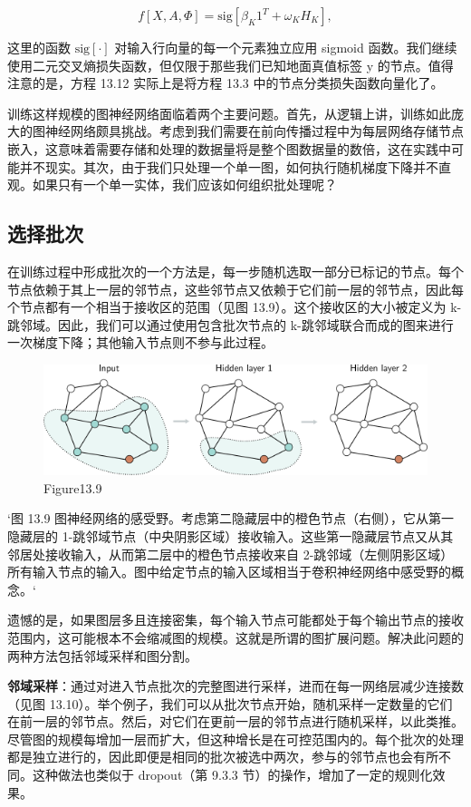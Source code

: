 \begin{equation}
f[X, A, \Phi] = \text{sig} [\beta_K 1^T + \omega_K H_K ], 
\end{equation}

这里的函数 \(\text{sig}[\cdot]\) 对输入行向量的每一个元素独立应用 sigmoid 函数。我们继续使用二元交叉熵损失函数，但仅限于那些我们已知地面真值标签 y 的节点。值得注意的是，方程 13.12 实际上是将方程 13.3 中的节点分类损失函数向量化了。

训练这样规模的图神经网络面临着两个主要问题。首先，从逻辑上讲，训练如此庞大的图神经网络颇具挑战。考虑到我们需要在前向传播过程中为每层网络存储节点嵌入，这意味着需要存储和处理的数据量将是整个图数据量的数倍，这在实践中可能并不现实。其次，由于我们只处理一个单一图，如何执行随机梯度下降并不直观。如果只有一个单一实体，我们应该如何组织批处理呢？
\subsection{选择批次}
在训练过程中形成批次的一个方法是，每一步随机选取一部分已标记的节点。每个节点依赖于其上一层的邻节点，这些邻节点又依赖于它们前一层的邻节点，因此每个节点都有一个相当于接收区的范围（见图 13.9）。这个接收区的大小被定义为 k-跳邻域。因此，我们可以通过使用包含批次节点的 k-跳邻域联合而成的图来进行一次梯度下降；其他输入节点则不参与此过程。

\begin{figure}[ht!]
\centering
\includegraphics[width=0.7\linewidth]{png/chapter13/GraphReceptiveField.png}
\caption{Figure13.9}
\end{figure}

`图 13.9 图神经网络的感受野。考虑第二隐藏层中的橙色节点（右侧），它从第一隐藏层的 1-跳邻域节点（中央阴影区域）接收输入。这些第一隐藏层节点又从其邻居处接收输入，从而第二层中的橙色节点接收来自 2-跳邻域（左侧阴影区域）所有输入节点的输入。图中给定节点的输入区域相当于卷积神经网络中感受野的概念。`

遗憾的是，如果图层多且连接密集，每个输入节点可能都处于每个输出节点的接收范围内，这可能根本不会缩减图的规模。这就是所谓的图扩展问题。解决此问题的两种方法包括邻域采样和图分割。

\textbf{邻域采样}：通过对进入节点批次的完整图进行采样，进而在每一网络层减少连接数（见图 13.10）。举个例子，我们可以从批次节点开始，随机采样一定数量的它们在前一层的邻节点。然后，对它们在更前一层的邻节点进行随机采样，以此类推。尽管图的规模每增加一层而扩大，但这种增长是在可控范围内的。每个批次的处理都是独立进行的，因此即便是相同的批次被选中两次，参与的邻节点也会有所不同。这种做法也类似于 dropout（第 9.3.3 节）的操作，增加了一定的规则化效果。

